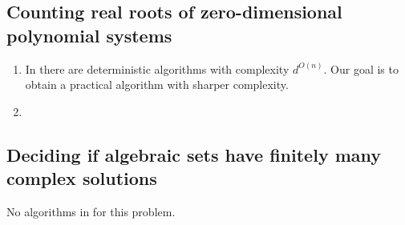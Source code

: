 \documentclass[10pt]{article}
\theoremstyle{definition}
\begin{document}
\subsection{Counting real roots of zero-dimensional polynomial systems}
\begin{enumerate}
    \item In \cite{BasuPollackRoy2006} there are deterministic algorithms with complexity $d^{O(n)}$. Our goal is to obtain a practical algorithm with sharper complexity. 
    \item 
\end{enumerate}



\subsection{Deciding if algebraic sets have finitely many complex solutions}
No algorithms in \cite{BasuPollackRoy2006} for this problem. 



\newpage 


\newpage 
\end{document}
